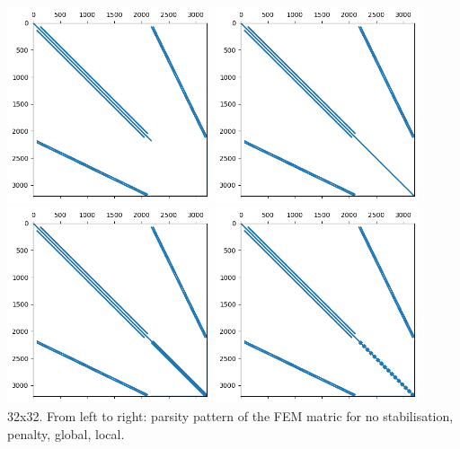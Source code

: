 \begin{center}
\includegraphics[width=6cm]{python_codes/fieldstone_115/results/dh/nostab/matrix}
\includegraphics[width=6cm]{python_codes/fieldstone_115/results/dh/penalty/matrix}
\includegraphics[width=6cm]{python_codes/fieldstone_115/results/dh/global/matrix}
\includegraphics[width=6cm]{python_codes/fieldstone_115/results/dh/local/matrix}\\
{\captionfont 32x32. From left to right: parsity pattern of the FEM matric for 
no stabilisation, penalty, global, local.}
\end{center}

